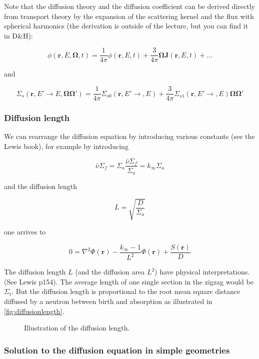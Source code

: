 Note that the diffusion theory and the diffusion coefficient can be derived directly from transport theory by the expansion of the scattering kernel and the flux with spherical harmonics (the derivation is outside of the lecture, but you can find it in D\&H):

$$\phi(\mathbf{r},E,\mathbf{\Omega},t)=\frac{1}{4\pi}\phi(\mathbf{r},E,t)+\frac{3}{4\pi}\mathbf{\Omega}\mathbf{J}(\mathbf{r},E,t)+...$$

and

$$\Sigma_s(\mathbf{r},E'\rightarrow E,\mathbf{\Omega\Omega}')=\frac{1}{4\pi}\Sigma_{s0}(\mathbf{r},E'\rightarrow,E)+\frac{3}{4\pi}\Sigma_{s1}(\mathbf{r},E'\rightarrow,E)\mathbf{\Omega\Omega}'$$

\subsubsection{Diffusion length}

We can rearrange the diffusion equation by introducing various constants (see the Lewis book), for example by introducing

$$\bar\nu\Sigma_f=\Sigma_a\frac{\bar\nu\Sigma_f}{\Sigma_a}=k_\infty\Sigma_a$$

\noindent and the diffusion length

$$L=\sqrt{\frac{D}{\Sigma_a}}$$

\noindent one arrives to

\begin{equation}
0= \nabla^2 \Phi(\mathbf{r})-\frac{k_\infty-1}{L^2}\Phi(\mathbf{r})+\frac{S(\mathbf{r})}{D}
\end{equation}

The diffusion length $L$ (and the diffusion area $L^2$) have physical interpretations. (See Lewis p154). The average length of one single section in the zigzag would be $\Sigma_t$. But the diffusion length is proportional to the root mean square distance diffused by a neutron between birth and absorption as illustrated in \autoref{fig:diffusionlength}.

\begin{figure}[ht!]
\protect {}\protect
\caption{\label{fig:diffusionlength} \footnotesize{Illustration of the diffusion length.}}
\end{figure} 

\subsubsection{Solution to the diffusion equation in simple geometries}

